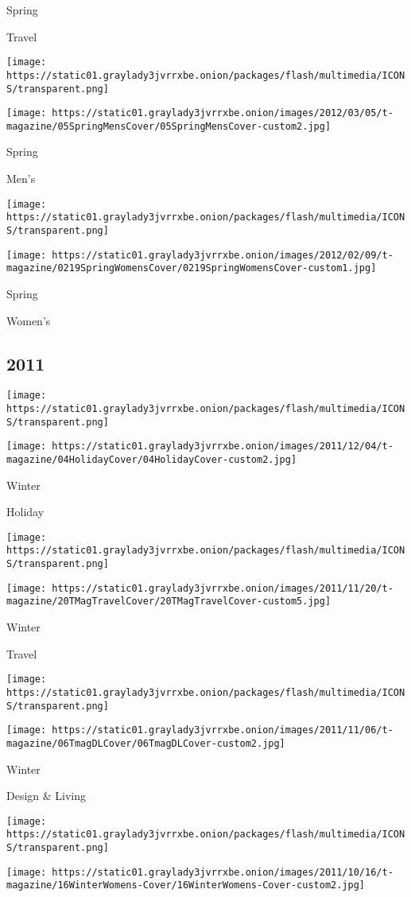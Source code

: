 Spring

Travel

\texttt{[image: https://static01.graylady3jvrrxbe.onion/packages/flash/multimedia/ICONS/transparent.png]}

\texttt{[image: https://static01.graylady3jvrrxbe.onion/images/2012/03/05/t-magazine/05SpringMensCover/05SpringMensCover-custom2.jpg]}

Spring

Men's

\texttt{[image: https://static01.graylady3jvrrxbe.onion/packages/flash/multimedia/ICONS/transparent.png]}

\texttt{[image: https://static01.graylady3jvrrxbe.onion/images/2012/02/09/t-magazine/0219SpringWomensCover/0219SpringWomensCover-custom1.jpg]}

Spring

Women's

\hypertarget{2011}{%
\subsection{2011}\label{2011}}

\texttt{[image: https://static01.graylady3jvrrxbe.onion/packages/flash/multimedia/ICONS/transparent.png]}

\texttt{[image: https://static01.graylady3jvrrxbe.onion/images/2011/12/04/t-magazine/04HolidayCover/04HolidayCover-custom2.jpg]}

Winter

Holiday

\texttt{[image: https://static01.graylady3jvrrxbe.onion/packages/flash/multimedia/ICONS/transparent.png]}

\texttt{[image: https://static01.graylady3jvrrxbe.onion/images/2011/11/20/t-magazine/20TMagTravelCover/20TMagTravelCover-custom5.jpg]}

Winter

Travel

\texttt{[image: https://static01.graylady3jvrrxbe.onion/packages/flash/multimedia/ICONS/transparent.png]}

\texttt{[image: https://static01.graylady3jvrrxbe.onion/images/2011/11/06/t-magazine/06TmagDLCover/06TmagDLCover-custom2.jpg]}

Winter

Design \& Living

\texttt{[image: https://static01.graylady3jvrrxbe.onion/packages/flash/multimedia/ICONS/transparent.png]}

\texttt{[image: https://static01.graylady3jvrrxbe.onion/images/2011/10/16/t-magazine/16WinterWomens-Cover/16WinterWomens-Cover-custom2.jpg]}

